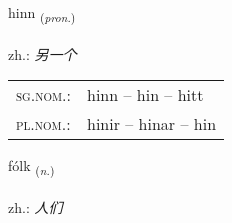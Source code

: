 \documentclass[frontgrid, backgrid]{flacards}\usepackage[]{graphicx}\usepackage[]{xcolor}
\begin{document}
\renewcommand{\blhead}{\vskip5pt {\small\bfseries\footnotesize Fornafn | 代词 }}
\renewcommand{\bcfoot}{\vskip5pt \hspace{2pt}{\small\bfseries\footnotesize 1K}}


{hinn \small{\textsubscript{(\textit{pron.})}} \\[1ex] %
\textphonetic{[hɪn]} \\
zh.: \emph{另一个} \\  [2ex]
\renewcommand*{\arraystretch}{0.8}
\begin{tabular}{ll}
\textsc{sg.nom.}: & hinn  --  hin -- hitt \\ 
\textsc{pl.nom.}: & hinir -- hinar -- hin
\end{tabular}
}

\renewcommand{\flhead}{\vskip5pt \fboxsep=0pt {\small\bfseries\footnotesize Nafnorð | 名词}}
\renewcommand{\fcfoot}{\vskip5pt \fboxsep=0pt \hspace{2pt}{\small\bfseries\footnotesize 1K}}

\renewcommand{\blhead}{\vskip5pt {\small\bfseries\footnotesize Nafnorð | 名词 }}
\renewcommand{\bcfoot}{\vskip5pt \hspace{2pt}{\small\bfseries\footnotesize 1K}}


{fólk \small{\textsubscript{(\textit{n.})}} \\[1ex] %
\textphonetic{[foul̥k]} \\
zh.: \emph{人们} \\  [2ex]
\renewcommand*{\arraystretch}{0.8}
}

\renewcommand{\flhead}{\vskip5pt \fboxsep=0pt {\small\bfseries\footnotesize Sagnorð | 动词}}
\renewcommand{\fcfoot}{\vskip5pt \fboxsep=0pt \hspace{2pt}{\small\bfseries\footnotesize 1K}}
\end{document}
